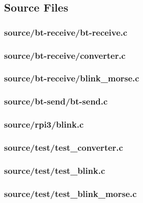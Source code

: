 \subsection{Source Files}


\subsubsection*{source/bt-receive/bt-receive.c}


\subsubsection*{source/bt-receive/converter.c}


\subsubsection*{source/bt-receive/blink\_morse.c}


\subsubsection*{source/bt-send/bt-send.c}


\subsubsection*{source/rpi3/blink.c}


\subsubsection*{source/test/test\_converter.c}


\subsubsection*{source/test/test\_blink.c}


\subsubsection*{source/test/test\_blink\_morse.c}


